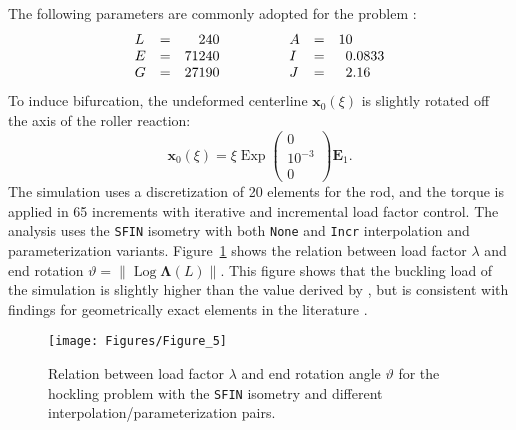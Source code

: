 The following parameters are commonly adopted for the problem \citep{nour-omid1991finite,saleeb1992effective}:
\[
\begin{array}{lcr}
    L &=&   240 \\ %
    E &=& 71240 \\ %
    G &=& 27190 \\ %
\end{array}
\qquad\qquad
\begin{array}{lcr}
    A &=& 10\hphantom{.0833}  \\
    I &=& 0.0833 \\
    J &=& 2.16\hphantom{33}   \\
\end{array}
\]
To induce bifurcation, the undeformed
centerline \(\boldsymbol{x}_0(\xi)\) is slightly rotated off the axis of the roller reaction:
%
\begin{equation*}
\boldsymbol{x}_0(\xi) = \xi \operatorname{Exp}\begin{pmatrix}
  0 \\ 10^{-3} \\ 0
\end{pmatrix} \mathbf{E}_1 .
\end{equation*}
%
The simulation uses a discretization of 20 elements for the rod, and the torque is applied in 65 increments with iterative and incremental load factor control. The analysis uses the \texttt{SFIN} isometry with both \texttt{None} and \texttt{Incr} interpolation and parameterization variants.
Figure~\ref{fig:hockle-plot} shows the relation between load factor \(\lambda\) and end rotation \(\vartheta = \|\operatorname{Log}\boldsymbol{\Lambda}(L)\|\).
%
This figure shows that the buckling load of the simulation is slightly higher than the value derived by \cite{ziegler1977principles}, but 
is consistent with findings for geometrically exact elements in the literature \citep{nour-omid1991finite,ibrahimbegović1996role,saleeb1992effective,santos2011hybridmixed}.

\begin{figure}[!h]
    \centering
    \texttt{[image: Figures/Figure\_5]}
    \caption{Relation between load factor \(\lambda\) and end rotation angle \(\vartheta\) for the hockling problem with the \texttt{SFIN} isometry and different interpolation/parameterization pairs.}
    \label{fig:hockle-plot}
\end{figure}
